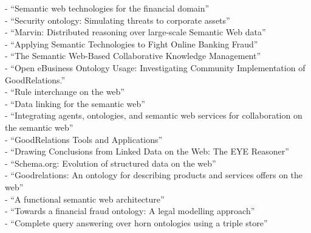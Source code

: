 - ``Semantic web technologies for the financial domain'' \citep{lara2007semantic} \\
- ``Security ontology: Simulating threats to corporate assets'' \citep{ekelhart2006security} \\
- ``Marvin: Distributed reasoning over large-scale Semantic Web data'' \citep{oren2009marvin} \\
- ``Applying Semantic Technologies to Fight Online Banking Fraud'' \citep{carvalhoapplying} \\
- ``The Semantic Web-Based Collaborative Knowledge Management'' \citep{chao2012semantic} \\
- ``Open eBusiness Ontology Usage: Investigating Community Implementation of GoodRelations.'' \citep{ashraf2011open} \\
- ``Rule interchange on the web'' \citep{boley2007rule} \\
- ``Data linking for the semantic web'' \citep{scharffe2011data} \\
- ``Integrating agents, ontologies, and semantic web services for collaboration on the semantic web'' \citep{stollberg2005integrating} \\
- ``GoodRelations Tools and Applications'' \citep{hepp2009goodrelations} \\
- ``Drawing Conclusions from Linked Data on the Web: The EYE Reasoner'' \citep{verborgh2015drawing} \\
- ``Schema.org: Evolution of structured data on the web'' \citep{guha2016schema} \\
- ``Goodrelations: An ontology for describing products and services offers on the web'' \citep{hepp2008goodrelations} \\
- ``A functional semantic web architecture'' \citep{gerber2008functional} \\
- ``Towards a financial fraud ontology: A legal modelling approach'' \citep{kingston2004towards} \\
- ``Complete query answering over horn ontologies using a triple store'' \citep{zhou2013complete}


